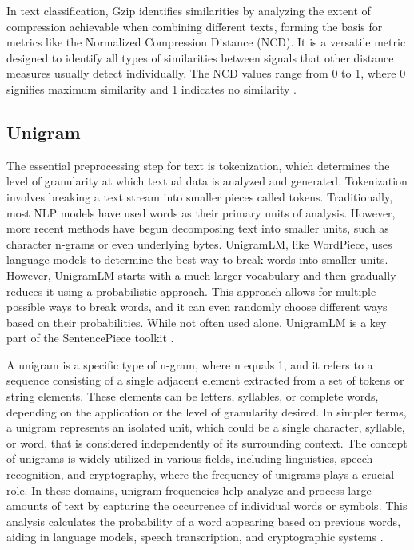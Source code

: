 \documentclass{article}
\begin{document}
In text classification, Gzip identifies similarities by analyzing the extent of compression achievable when combining different texts, forming the basis for metrics like the Normalized Compression Distance (NCD). It is a versatile metric designed to identify all types of similarities between signals that other distance measures usually detect individually. The NCD values range from 0 to 1, where 0 signifies maximum similarity and 1 indicates no similarity \cite{Pascarella2022}.

\subsection{Unigram}

The essential preprocessing step for text is tokenization, which determines the level of granularity at which textual data is analyzed and generated. Tokenization involves breaking a text stream into smaller pieces called tokens. Traditionally, most NLP models have used words as their primary units of analysis. However, more recent methods have begun decomposing text into smaller units, such as character n-grams or even underlying bytes. UnigramLM, like WordPiece, uses language models to determine the best way to break words into smaller units. However, UnigramLM starts with a much larger vocabulary and then gradually reduces it using a probabilistic approach. This approach allows for multiple possible ways to break words, and it can even randomly choose different ways based on their probabilities. While not often used alone, UnigramLM is a key part of the SentencePiece toolkit \cite{Gasparetto2022}. 

A unigram is a specific type of n-gram, where n equals 1, and it refers to a sequence consisting of a single adjacent element extracted from a set of tokens or string elements. These elements can be letters, syllables, or complete words, depending on the application or the level of granularity desired. In simpler terms, a unigram represents an isolated unit, which could be a single character, syllable, or word, that is considered independently of its surrounding context. The concept of unigrams is widely utilized in various fields, including linguistics, speech recognition, and cryptography, where the frequency of unigrams plays a crucial role. In these domains, unigram frequencies help analyze and process large amounts of text by capturing the occurrence of individual words or symbols. This analysis calculates the probability of a word appearing based on previous words, aiding in language models, speech transcription, and cryptographic systems \cite{Jimoh2021}.
\end{document}

